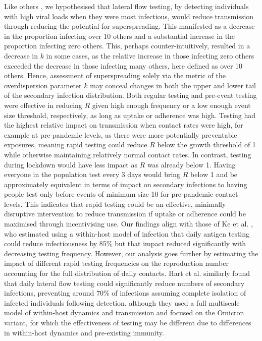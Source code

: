 \documentclass[
  10pt,
  letterpaper,
]{article}
\begin{document}
Like others \citep{ke2022, hart2023, middleton2024}, we hypothesised
that lateral flow testing, by detecting individuals with high viral
loads when they were most infectious, would reduce transmission through
reducing the potential for superspreading. This manifested as a decrease
in the proportion infecting over 10 others and a substantial increase in
the proportion infecting zero others. This, perhaps counter-intuitively,
resulted in a decrease in \(k\) in some cases, as the relative increase
in those infecting zero others exceeded the decrease in those infecting
many others, here defined as over 10 others. Hence, assessment of
superspreading solely via the metric of the overdispersion parameter
\(k\) may conceal changes in both the upper and lower tail of the
secondary infection distribution. Both regular testing and pre-event
testing were effective in reducing \(R\) given high enough frequency or
a low enough event size threshold, respectively, as long as uptake or
adherence was high. Testing had the highest relative impact on
transmission when contact rates were high, for example at pre-pandemic
levels, as there were more potentially preventable exposures, meaning
rapid testing could reduce \(R\) below the growth threshold of 1 while
otherwise maintaining relatively normal contact rates. In contrast,
testing during lockdown would have less impact as \(R\) was already
below 1. Having everyone in the population test every 3 days would bring
\(R\) below 1 and be approximately equivalent in terms of impact on
secondary infections to having people test only before events of minimum
size 10 for pre-pandemic contact levels. This indicates that rapid
testing could be an effective, minimally disruptive intervention to
reduce transmission if uptake or adherence could be maximised through
incentivising use. Our findings align with those of Ke et al.
\citep{ke2022}, who estimated using a within-host model of infection
that daily antigen testing could reduce infectiousness by 85\% but that
impact reduced significantly with decreasing testing frequency. However,
our analysis goes further by estimating the impact of different rapid
testing frequencies on the reproduction number accounting for the full
distribution of daily contacts. Hart et al. \citep{hart2023} similarly
found that daily lateral flow testing could significantly reduce numbers
of secondary infections, preventing around 70\% of infections assuming
complete isolation of infected individuals following detection, although
they used a full multiscale model of within-host dynamics and
transmission and focused on the Omicron variant, for which the
effectiveness of testing may be different due to differences in
within-host dynamics and pre-existing immunity.
\end{document}
